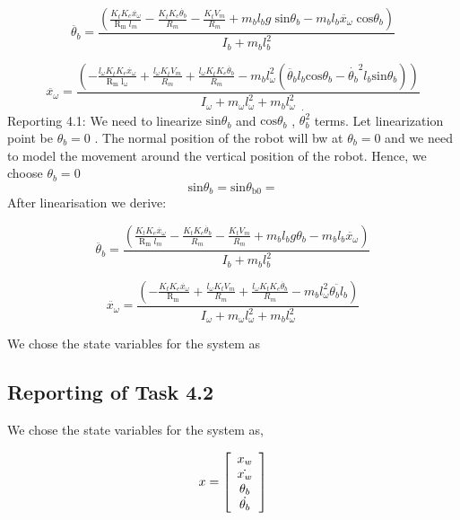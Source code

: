 \documentclass[11pt]{article}
\begin{document}
 $$\ddot{\theta_b} =\frac{\left(\frac{K_t K_e \dot{x_{\omega } } }{\mathrm{R_m}\;l_m }-\frac{K_t K_e \dot{\theta_b }}{R_m }-\frac{K_t V_m  }{R_m}+m_b l_b g\;\mathrm{sin}\theta_b -m_b l_b \ddot{x_{\omega }} \;\mathrm{cos}\theta_b \right)}{I_b +m_b l_b^2}$$
 
$$\ddot{x_\omega} =\frac{\left(-\frac{l_\omega K_t K_e \dot{x_\omega} }{\mathrm{R_m\;l_\omega} }+\frac{l_\omega K_t V_m}{R_m }+\frac{l_\omega K_t K_e \dot{\theta_b}}{R_m}- m_b l_\omega^2 (\ddot{\theta_b} l_b \mathrm{cos}\theta_b - \dot{\theta_b}^2 l_b \mathrm{sin}\theta_b)\right)}{I_\omega + m_\omega l_\omega^2 + m_b l_\omega^2 }$$
Reporting 4.1:
\newline
We need to linearize $\mathrm{sin}\theta_b$ and $\mathrm{cos}\theta_b$ , $\dot{\theta_b^2}$ terms. Let linearization point be $\theta_b = 0$ . The normal position of the robot will bw at  $\theta_b = 0$ and we need to model the movement around the vertical position of the robot. Hence, we choose $\theta_b = 0$ 
\newline
$$\mathrm{sin}\theta_b = \mathrm{sin}\theta_{\mathrm{b0}} = $$
 \newline
 After linearisation we derive:
 
 $$\ddot{\theta_b} =\frac{\left(\frac{K_t K_e \dot{x_{\omega } } }{\mathrm{R_m}\;l_m }-\frac{K_t K_e \dot{\theta_b }}{R_m }-\frac{K_t V_m  }{R_m}+m_b l_b g\theta_b -m_b l_b \ddot{x_{\omega }} \right)}{I_b +m_b l_b^2}$$
 
$$\ddot{x_\omega} =\frac{\left(-\frac{ K_t K_e \dot{x_\omega} }{\mathrm{R_m\;} }+\frac{l_\omega K_t V_m}{R_m }+\frac{l_\omega K_t K_e \dot{\theta_b}}{R_m}- m_b l_\omega^2 \ddot{\theta_b l_b} \right)}{I_\omega + m_\omega l_\omega^2 + m_b l_\omega^2 }$$
 


We chose the state variables for the system as

\subsection*{Reporting of Task 4.2}

\begin{par}
\begin{flushleft}
We chose the state variables for the system as, 
\end{flushleft}
\end{par}

\begin{par}
$$x=\left\lbrack \begin{array}{c}\linebreak 
x_w \\\linebreak 
\dot{x_w } \\\linebreak 
\theta_b \\\linebreak 
\dot{\theta_b } \linebreak 
\end{array}\right\rbrack$$
\end{par}
\end{document}
